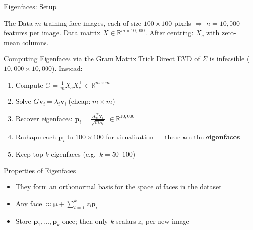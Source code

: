 \documentclass{beamer}
\begin{document}
\begin{frame}[shrink=10]{Eigenfaces: Setup}
  \begin{block}{The Data}
    $m$ training face images, each of size $100 \times 100$ pixels
    $\Rightarrow$ $n = 10{,}000$ features per image.
    Data matrix $X \in \mathbb{R}^{m \times 10{,}000}$.
    After centring: $X_c$ with zero-mean columns.
  \end{block}

  \begin{block}{Computing Eigenfaces via the Gram Matrix Trick}
    Direct EVD of $\Sigma$ is infeasible ($10{,}000 \times 10{,}000$).
    Instead:
    \begin{enumerate}\setlength\itemsep{5pt}
      \item Compute $G = \frac{1}{m}X_c X_c^\top \in \mathbb{R}^{m\times m}$
      \item Solve $G\mathbf{v}_i = \lambda_i\mathbf{v}_i$ (cheap: $m \times m$)
      \item Recover eigenfaces:
            $\mathbf{p}_i = \frac{X_c^\top\mathbf{v}_i}{\sqrt{m\lambda_i}}$
            $\in \mathbb{R}^{10{,}000}$
      \item Reshape each $\mathbf{p}_i$ to $100 \times 100$ for
            visualisation --- these are the \textbf{eigenfaces}
      \item Keep top-$k$ eigenfaces (e.g.\ $k = 50$--$100$)
    \end{enumerate}
  \end{block}

  \begin{block}{Properties of Eigenfaces}
    \begin{itemize}\setlength\itemsep{4pt}
      \item They form an orthonormal basis for the space of faces in
            the dataset
      \item Any face $\approx \boldsymbol{\mu} + \sum_{i=1}^k z_i\mathbf{p}_i$
      \item Store $\mathbf{p}_1,\ldots,\mathbf{p}_k$ once;
            then only $k$ scalars $z_i$ per new image
    \end{itemize}
  \end{block}
\end{frame}
\end{document}
